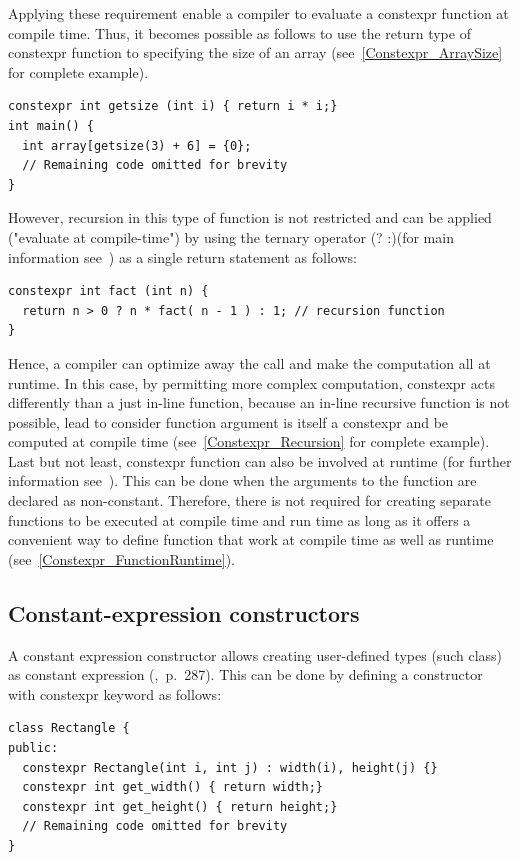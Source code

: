 \documentclass[11pt]{report}
\begin{document}
Applying these requirement enable a compiler to evaluate a constexpr function at compile time. Thus, it becomes possible as follows to use the return type of constexpr function to specifying the size of an array (see~\ref{Constexpr_ArraySize} for complete example).
\begin{lstlisting}
constexpr int getsize (int i) { return i * i;}
int main() {
  int array[getsize(3) + 6] = {0};
  // Remaining code omitted for brevity
}
\end{lstlisting}

However, recursion in this type of function is not restricted and can be applied ("evaluate at compile-time") by using the ternary operator (? :)(for main information see~\cite{Allain:2011:FutureCpp}) as a single return statement as follows:
\begin{lstlisting}
constexpr int fact (int n) {
  return n > 0 ? n * fact( n - 1 ) : 1; // recursion function
}
\end{lstlisting}

Hence, a compiler can optimize away the call and make the computation all at runtime. In this case, by permitting more complex computation, constexpr acts differently than a just in-line function, because an in-line recursive function is not possible, lead to consider function argument is itself a constexpr and be computed at compile time (see~\ref{Constexpr_Recursion} for complete example). Last but not least, constexpr function can also be involved at runtime (for further information see~\cite{Allain:2011:FutureCpp}). This can be done when the arguments to the function are declared as non-constant. Therefore, there is not required for creating separate functions to be executed at compile time and run time as long as it offers a convenient way to define function that work at compile time as well as runtime (see~\ref{Constexpr_FunctionRuntime}).

\subsection{Constant-expression constructors}
\label{subsection: Constant Expression Constructors}
A constant expression constructor allows creating user-defined types (such class) as constant expression (\cite{Gregorie:professionalcpp},~p.~287). This can be done by defining a constructor with constexpr keyword as follows:
\begin{lstlisting}
class Rectangle {
public:
  constexpr Rectangle(int i, int j) : width(i), height(j) {}
  constexpr int get_width() { return width;}
  constexpr int get_height() { return height;}
  // Remaining code omitted for brevity
}
\end{lstlisting}
\end{document}
